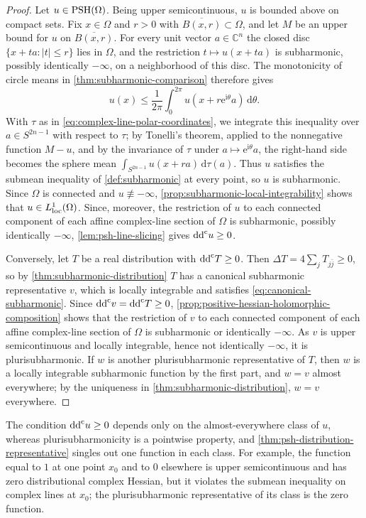 \begin{proof}
Let $u\in\mathrm{PSH}(\Omega)$. Being upper semicontinuous, $u$ is bounded above on compact sets. Fix $x\in\Omega$ and $r>0$ with $\overline{B(x,r)}\subset\Omega$, and let $M$ be an upper bound for $u$ on $\overline{B(x,r)}$. For every unit vector $a\in\mathbb{C}^n$ the closed disc $\{x+ta:|t|\leq r\}$ lies in $\Omega$, and the restriction $t\mapsto u(x+ta)$ is subharmonic, possibly identically $-\infty$, on a neighborhood of this disc. The monotonicity of circle means in \cref{thm:subharmonic-comparison} therefore gives
\[
 u(x)\leq\frac1{2\pi}\int_0^{2\pi}u(x+r\mathrm{e}^{\mathrm{i}\theta}a)\,\mathrm d\theta.
\]
With $\tau$ as in \eqref{eq:complex-line-polar-coordinates}, we integrate this inequality over $a\in S^{2n-1}$ with respect to $\tau$; by Tonelli's theorem, applied to the nonnegative function $M-u$, and by the invariance of $\tau$ under $a\mapsto\mathrm{e}^{\mathrm{i}\theta}a$, the right-hand side becomes the sphere mean $\int_{S^{2n-1}}u(x+ra)\,\mathrm{d}\tau(a)$. Thus $u$ satisfies the submean inequality of \cref{def:subharmonic} at every point, so $u$ is subharmonic. Since $\Omega$ is connected and $u\not\equiv-\infty$, \cref{prop:subharmonic-local-integrability} shows that $u\in L^1_{\mathrm{loc}}(\Omega)$. Since, moreover, the restriction of $u$ to each connected component of each affine complex-line section of $\Omega$ is subharmonic, possibly identically $-\infty$, \cref{lem:psh-line-slicing} gives $\mathrm{dd}^{\mathrm{c}} u\ge0$.

Conversely, let $T$ be a real distribution with $\mathrm{dd}^{\mathrm{c}} T\geq0$. Then $\Delta T=4\sum_jT_{j\bar j}\geq0$, so by \cref{thm:subharmonic-distribution} $T$ has a canonical subharmonic representative $v$, which is locally integrable and satisfies \eqref{eq:canonical-subharmonic}. Since $\mathrm{dd}^{\mathrm{c}} v=\mathrm{dd}^{\mathrm{c}} T\geq0$, \cref{prop:positive-hessian-holomorphic-composition} shows that the restriction of $v$ to each connected component of each affine complex-line section of $\Omega$ is subharmonic or identically $-\infty$. As $v$ is upper semicontinuous and locally integrable, hence not identically $-\infty$, it is plurisubharmonic. If $w$ is another plurisubharmonic representative of $T$, then $w$ is a locally integrable subharmonic function by the first part, and $w=v$ almost everywhere; by the uniqueness in \cref{thm:subharmonic-distribution}, $w=v$ everywhere.
\end{proof}

The condition $\mathrm{dd}^{\mathrm{c}} u\geq0$ depends only on the almost-everywhere class of $u$, whereas plurisubharmonicity is a pointwise property, and \cref{thm:psh-distribution-representative} singles out one function in each class. For example, the function equal to $1$ at one point $x_0$ and to $0$ elsewhere is upper semicontinuous and has zero distributional complex Hessian, but it violates the submean inequality on complex lines at $x_0$; the plurisubharmonic representative of its class is the zero function.

